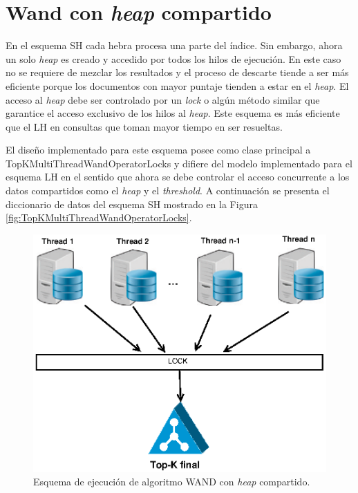 \section{Wand con \textit{heap} compartido}
\label{scheduling:whc}
En el esquema SH cada hebra procesa una parte del índice. Sin embargo, ahora un solo \textit{heap} es creado y accedido por todos los hilos de ejecución. En este caso no se requiere de mezclar los resultados y el proceso de descarte tiende a ser más eficiente porque los documentos con mayor puntaje tienden a estar en el \textit{heap}. El acceso al \textit{heap} debe ser controlado por un \textit{lock} o algún método similar que garantice el acceso exclusivo de los hilos al \textit{heap}. Este esquema es más eficiente que el LH en consultas que toman mayor tiempo en ser resueltas.

El diseño implementado para este esquema posee como clase principal a TopKMultiThreadWandOperatorLocks y difiere del modelo implementado para el esquema LH en el sentido que ahora se debe controlar el acceso concurrente a los datos compartidos como el \textit{heap} y el \textit{threshold}. A continuación se presenta el diccionario de datos del esquema SH mostrado en la Figura \ref{fig:TopKMultiThreadWandOperatorLocks}.

\begin{figure}[!ht]
\centering
\includegraphics[scale=.75]{images/wand_heaps_compartido.eps}
\caption{Esquema de ejecución de algoritmo WAND con \textit{heap} compartido.}
\label{fig:wand-heap-compartido}
\end{figure}

